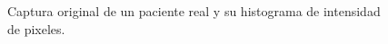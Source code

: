 \begin{figure}[H]
        \hspace{-0.6cm}
         \hspace{0.1cm}        
  \caption{Captura original de un paciente real y su histograma de intensidad de pixeles.}
      \label{abelhistposta}
\end{figure}


